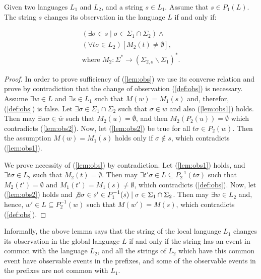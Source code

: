 \documentclass[letterpaper, 10pt, conference]{ieeeconf}
\begin{document}
\begin{lemma}
\label{lem_changed_observation}
Given two languages $L_1$ and $L_2$, and a string $s \in L_1$.
Assume that $s \in P_1(L)$. The string $s$ changes its observation in the
language $L$ if and only if:
\end{lemma}
\begin{subequations}\label{lem:obs}
\begin{align}
	(\exists \sigma \in s \mid \sigma \in \Sigma_1 \cap \Sigma_2) \land
	\label{lem:obs1}
	\\
	(\forall t\sigma \in L_2)
	\left[M_2(t) \neq \emptyset \right],
	\label{lem:obs2}
	\\
	\textrm{where } M_2: \Sigma^* \rightarrow (\Sigma_{2,o} \backslash
	\Sigma_1)^*. 
	\label{lem:obs3}
\end{align}
\end{subequations}

\begin{proof}
In order to prove sufficiency of (\ref{lem:obs}) we use its converse relation
and prove by contradiction that the change of observation (\ref{def:obs}) is
necessary.
Assume $\exists w \in L$ and $\exists s \in L_1$ such that
$M(w)= M_1(s)$ and, therefor, (\ref{def:obs}) is false. Let $\exists
\sigma \in \Sigma_1 \cap \Sigma_2$ such that $\sigma \in w$ and also
(\ref{lem:obs1}) holds. Then may $\exists u \sigma \in \overline{w}$ such that
$M_2(u) = \emptyset$, and then $M_2(P_2(u)) =
\emptyset$ which contradicts (\ref{lem:obs2}). Now, let (\ref{lem:obs2})
be true for all $t\sigma \in P_2(w)$. Then the assumption $M(w)=
M_1(s)$ holds only if $\sigma \not \in s$, which contradicts (\ref{lem:obs1}). 

We prove necessity of (\ref{lem:obs}) by contradiction.
Let (\ref{lem:obs1}) holds, and $\exists t\sigma \in L_2$ such that
$M_2(t) = \emptyset$. Then may $\exists t'\sigma \in 
L \subseteq P_2^{-1}(t\sigma)$ such that $M_2(t') =
\emptyset$ and $M_1(t') = M_1(s) \neq \emptyset$, which contradicts
(\ref{def:obs}).
Now, let (\ref{lem:obs2}) holds and $\not \exists \sigma \in s' \in P_1^{-1}(s)
\mid \sigma \in \Sigma_1 \cap \Sigma_2$. Then may $\exists w \in L_2$ and,
hence, $w' \in L \subseteq P_2^{-1}(w)$ such that $M(w')=M(s)$,
which contradicts (\ref{def:obs}).
\end{proof}

Informally, the above lemma says that the string of the local language $L_1$
changes its observation in the global language $L$ if and only if the string has
an event in common with the language $L_2$, and all the strings of $L_2$ which
have this common event have observable events in the prefixes, and some of the
observable events in the prefixes are not common with $L_1$.
\end{document}
